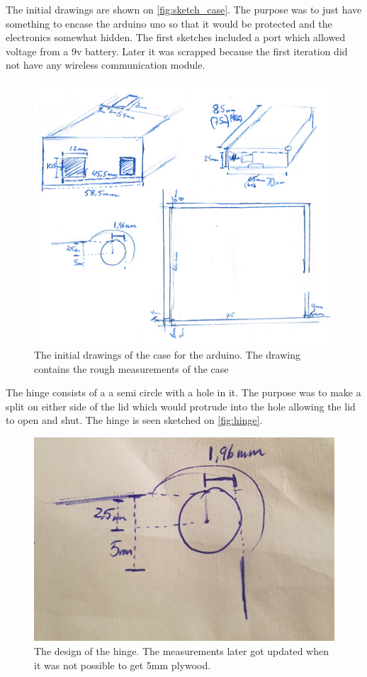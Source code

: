The initial drawings are shown on \autoref{fig:sketch_case}. The purpose was to just have something to encase the arduino uno so that it would be protected and the electronics somewhat hidden. The first sketches included a port which allowed voltage from a 9v battery. Later it was scrapped because the first iteration did not have any wireless communication module.
\begin{figure}
\centering
\includegraphics[scale=0.25]{Figure/sketch_case}
\caption{The initial drawings of the case for the arduino. The drawing contains the rough measurements of the case}
\label{fig:sketch_case}
\end{figure}

The hinge consists of a a semi circle with a hole in it. The purpose was to make a split on either side of the lid which would protrude into the hole allowing the lid to open and shut. The hinge is seen sketched on \autoref{fig:hinge}. 

\begin{figure}
\centering
\includegraphics[scale=0.50]{Figure/hinge.png}
\caption{The design of the hinge. The measurements later got updated when it was not possible to get 5mm plywood.}
\label{fig:hinge}
\end{figure}

